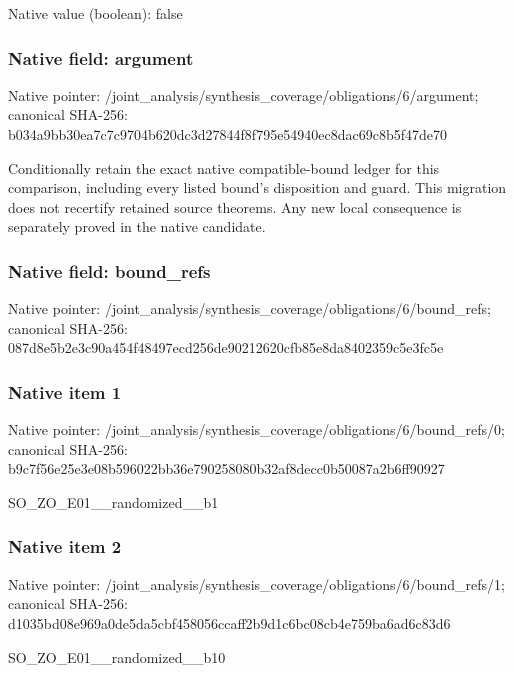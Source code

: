 \documentclass[10pt,a4paper]{article}
\begin{document}
Native value (boolean): false

\subsubsection{Native field: argument}
Native pointer: /joint\_\allowbreak{}analysis/synthesis\_\allowbreak{}coverage/obligations/6/argument; canonical SHA-256: b034a9bb30ea7c7c9704b620dc3d27844f8f795e54940ec8dac69c8b5f47de70

\begingroup\raggedright\sloppy Conditionally retain the exact native compatible-bound ledger for this comparison,\allowbreak{} including every listed bound's disposition and guard. This migration does not recertify retained source theorems. Any new local consequence is separately proved in the native candidate.\par\endgroup

\subsubsection{Native field: bound\_\allowbreak{}refs}
Native pointer: /joint\_\allowbreak{}analysis/synthesis\_\allowbreak{}coverage/obligations/6/bound\_\allowbreak{}refs; canonical SHA-256: 087d8e5b2e3c90a454f48497ecd256de90212620cfb85e8da8402359c5e3fc5e

\subsubsection{Native item 1}
Native pointer: /joint\_\allowbreak{}analysis/synthesis\_\allowbreak{}coverage/obligations/6/bound\_\allowbreak{}refs/0; canonical SHA-256: b9c7f56e25e3e08b596022bb36e790258080b32af8decc0b50087a2b6ff90927

\begingroup\raggedright\sloppy SO\_\allowbreak{}ZO\_\allowbreak{}E01\_\allowbreak{}\_\allowbreak{}randomized\_\allowbreak{}\_\allowbreak{}b1\par\endgroup

\subsubsection{Native item 2}
Native pointer: /joint\_\allowbreak{}analysis/synthesis\_\allowbreak{}coverage/obligations/6/bound\_\allowbreak{}refs/1; canonical SHA-256: d1035bd08e969a0de5da5cbf458056ccaff2b9d1c6bc08cb4e759ba6ad6c83d6

\begingroup\raggedright\sloppy SO\_\allowbreak{}ZO\_\allowbreak{}E01\_\allowbreak{}\_\allowbreak{}randomized\_\allowbreak{}\_\allowbreak{}b10\par\endgroup
\end{document}
